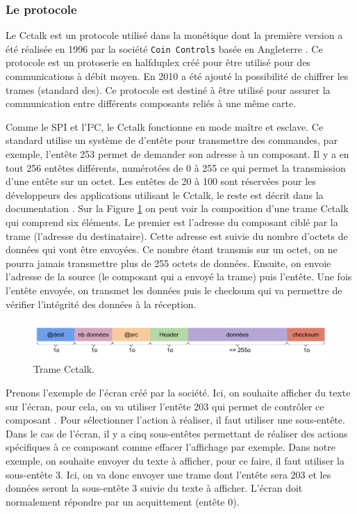 \documentclass[a4paper]{article}
\begin{document}
\subsubsection{Le protocole}

Le Cctalk est un protocole utilisé dans la monétique dont la première version a
été réalisée en 1996 par la société \verb|Coin Controls| basée en Angleterre
\cite{cctalkpt1}. Ce protocole est un \gls{protoserie} en \gls{halfduplex} créé
pour être utilisé pour des communications à débit moyen. En 2010 a été ajouté la
possibilité de chiffrer les trames (standard \gls{des}). Ce protocole est
destiné à être utilisé pour assurer la communication entre différents composants
reliés à une même carte.

Comme le SPI et l'I²C, le Cctalk fonctionne en mode maître et esclave. Ce
standard utilise un système de d'entête pour transmettre des commandes, par
exemple, l'entête 253 permet de demander son adresse à un composant. Il y a en
tout 256 entêtes différents, numérotées de 0 à 255 ce qui permet la
transmission d'une entête sur un octet. Les entêtes de 20 à 100 sont réservées
pour les développeurs des applications utilisant le Cctalk, le reste est décrit
dans la documentation \cite{cctalkpt2}. Sur la Figure \ref{tramecctalk} on peut
voir la composition d'une trame Cctalk qui comprend six éléments. Le premier est
l'adresse du composant ciblé par la trame (l'adresse du destinataire). Cette
adresse est suivie du nombre d'octets de données qui vont être envoyées. Ce
nombre étant transmis sur un octet, on ne pourra jamais transmettre plus de 255
octets de données. Ensuite, on envoie l'adresse de la source (le composant qui a
envoyé la trame) puis l'entête. Une fois l'entête envoyée, on transmet les
données puis le checksum qui va permettre de vérifier l'intégrité des données à
la réception.

\begin{figure}[h!]
  \begin{center}
  \includegraphics[scale=0.4]{./img/trame-cctalk.png}
  \caption{Trame Cctalk.}
    \label{tramecctalk}
  \end{center}
\end{figure}

Prenons l'exemple de l'écran créé par la société. Ici, on souhaite afficher du
texte sur l'écran, pour cela, on va utiliser l'entête 203 qui permet de
contrôler ce composant \cite{cctalkpt2}. Pour sélectionner l'action à réaliser,
il faut utiliser une sous-entête. Dans le cas de l'écran, il y a cinq
sous-entêtes permettant de réaliser des actions spécifiques à ce composant comme
effacer l'affichage par exemple. Dans notre exemple, on souhaite envoyer du
texte à afficher, pour ce faire, il faut utiliser la sous-entête 3. Ici, on va
donc envoyer une trame dont l'entête sera 203 et les données seront la
sous-entête 3 suivie du texte à afficher. L'écran doit normalement répondre par
un acquittement (entête 0).
\end{document}
